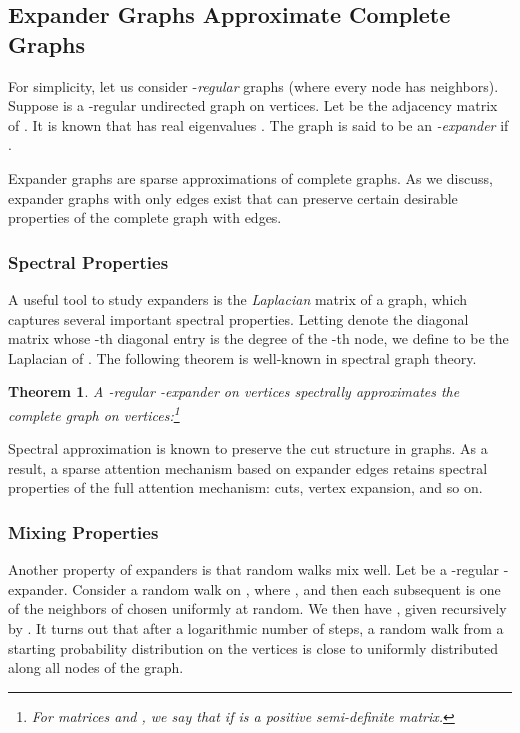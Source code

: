 \documentclass{article}
\theoremstyle{plain}
\newtheorem{theorem}{Theorem}[section]
\theoremstyle{definition}
\theoremstyle{remark}
\begin{document}
\subsection{Expander Graphs Approximate Complete Graphs}
For simplicity, let us consider -\emph{regular} graphs (where every node has   neighbors). Suppose  is a -regular undirected graph on  vertices. Let  be the  adjacency matrix of . It is known that  has  real eigenvalues . The graph  is said to be an \emph{-expander} if  \citep{hoory06}.


Expander graphs are sparse approximations of complete graphs.
As we discuss,
expander graphs with only  edges
exist that can preserve certain desirable properties of the complete graph with  edges.

\subsubsection{Spectral Properties}
A useful tool to study expanders is the \emph{Laplacian} matrix of a graph, which captures several important spectral properties.
Letting  denote the  diagonal matrix whose -th diagonal entry is the degree of the -th node, we define  to be the Laplacian of .
The following theorem is well-known in spectral graph theory.
\begin{theorem} 
\citep[Section 27.2]{spielman:sagt}
 A -regular -expander  on  vertices spectrally approximates the complete graph  on  vertices:\footnote{For matrices  and , we say that  if  is a positive semi-definite matrix.}
 
\end{theorem}
Spectral approximation is known to preserve the cut structure in graphs. As a result, a sparse attention mechanism based on expander edges retains spectral properties of the full attention mechanism: cuts, vertex expansion, and so on.

\subsubsection{Mixing Properties}
Another property of expanders is that random walks mix well.
Let  be a -regular -expander. Consider a random walk  on , where
,
and then each subsequent  is one of the  neighbors of  chosen uniformly at random.
We then have , given recursively by . 
It turns out that after a logarithmic number of steps, a random walk from a starting probability distribution on the vertices is close to uniformly distributed along all nodes of the graph.
\end{document}
